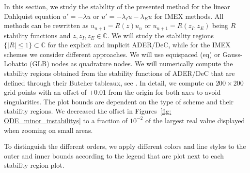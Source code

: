 In this section, we study the stability of the presented method for the linear Dahlquist equation $u' = -\lambda u$ or $u' = -\lambda_I u - \lambda_E u$ for IMEX methods. All methods can be rewritten as $u_{n+1} = R(z)u_n$ or $u_{n+1}= R(z_I,z_E)$ being $R$ stability functions and $z,z_I,z_E\in \mathbb C$. 
We will study the stability regions $\lbrace |R|\leq 1\rbrace \subset \mathbb C$ for the explicit and implicit ADER/DeC, while for the IMEX schemes we consider different approaches. 
We will use equispaced (eq) or Gauss-Lobatto (GLB) nodes as quadrature nodes.
We will numerically compute the stability regions obtained from the stability functions of ADER/DeC that are defined through their Butcher tableaux, see \cite{hairer1987solving}.
In detail, we compute on $200\times 200$ grid points with an offset of $+0.01$ from the origin for both axes to avoid singularities. 
The plot bounds are dependent on the type of scheme and their stability regions.
We decreased the offset in Figures~\ref{fig: ODE_minor_instabilitys} to a fraction of $10^{-2}$ of the largest real value displayed when zooming on small areas.

To distinguish the different orders, we apply different colors and line styles to the outer and inner bounds according to the legend that are plot next to each stability region plot.
